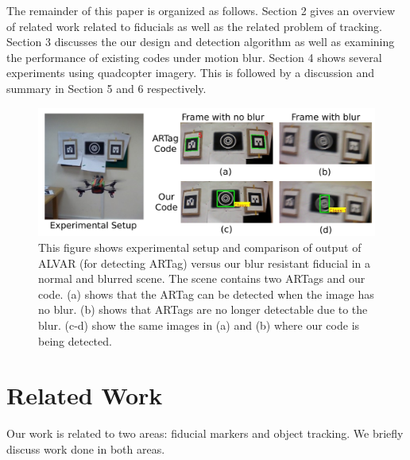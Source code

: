 \documentclass[runningheads]{llncs}
\begin{document}
The remainder of this paper is organized as follows.   Section 2 gives an
overview of related work related to fiducials as well as the related problem of
tracking.  Section 3 discusses the our design and detection algorithm as well as 
examining the performance of existing codes under motion blur. Section 4 shows several
experiments using quadcopter imagery.  This is followed by a discussion and
summary in Section 5 and 6 respectively.

\begin{figure}
\includegraphics[width=\linewidth]{teaser.pdf}
\caption{This figure shows experimental setup and comparison of
output of ALVAR\cite{alvar} (for detecting ARTag) versus our blur resistant fiducial
in a normal and blurred scene. The scene contains two ARTags and our code.
(a) shows that the ARTag can be detected when the image has no blur.
(b) shows that ARTags are no longer detectable due to the blur.
(c-d) show the same images in (a) and (b) where our code is being detected.}
\label{fig:teaser}
\end{figure}

\section{Related Work}

Our work is related to two areas: fiducial markers and object tracking. We
briefly discuss work done in both areas.
\end{document}
